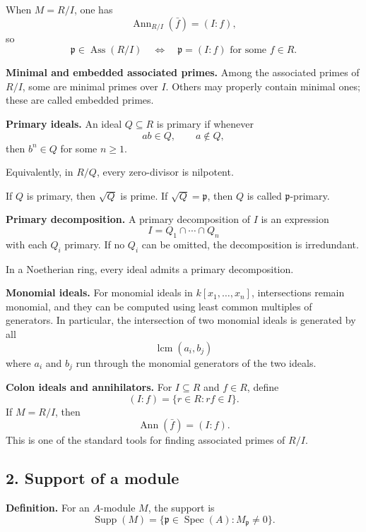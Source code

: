 \documentclass[12pt,a4paper]{article}
\theoremstyle{plain}
\theoremstyle{definition}      %
\begin{document}
	When \(M=R/I\), one has
	\[
	\operatorname{Ann}_{R/I}(\bar f)=(I:f),
	\]
	so
	\[
	\mathfrak p\in \operatorname{Ass}(R/I)
	\quad\Longleftrightarrow\quad
	\mathfrak p=(I:f)\text{ for some }f\in R.
	\]
	
	\medskip
	
	\textbf{Minimal and embedded associated primes.}
	Among the associated primes of \(R/I\), some are minimal primes over \(I\). Others may properly contain minimal ones; these are called embedded primes.
	
	\medskip
	
	\textbf{Primary ideals.}
	An ideal \(Q\subseteq R\) is primary if whenever
	\[
	ab\in Q,\qquad a\notin Q,
	\]
	then \(b^n\in Q\) for some \(n\ge 1\).
	
	Equivalently, in \(R/Q\), every zero-divisor is nilpotent.
	
	If \(Q\) is primary, then \(\sqrt Q\) is prime. If \(\sqrt Q=\mathfrak p\), then \(Q\) is called \(\mathfrak p\)-primary.
	
	\medskip
	
	\textbf{Primary decomposition.}
	A primary decomposition of \(I\) is an expression
	\[
	I=Q_1\cap\cdots\cap Q_n
	\]
	with each \(Q_i\) primary.
	If no \(Q_i\) can be omitted, the decomposition is irredundant.
	
	In a Noetherian ring, every ideal admits a primary decomposition.
	
	\medskip
	
	\textbf{Monomial ideals.}
	For monomial ideals in \(k[x_1,\dots,x_n]\), intersections remain monomial, and they can be computed using least common multiples of generators.
	In particular, the intersection of two monomial ideals is generated by all
	\[
	\operatorname{lcm}(a_i,b_j)
	\]
	where \(a_i\) and \(b_j\) run through the monomial generators of the two ideals.
	
	\medskip
	
	\textbf{Colon ideals and annihilators.}
	For \(I\subseteq R\) and \(f\in R\), define
	\[
	(I:f)=\{r\in R:rf\in I\}.
	\]
	If \(M=R/I\), then
	\[
	\operatorname{Ann}(\bar f)=(I:f).
	\]
	This is one of the standard tools for finding associated primes of \(R/I\).
	
	\subsection*{2. Support of a module}
	
	\textbf{Definition.}
	For an \(A\)-module \(M\), the support is
	\[
	\operatorname{Supp}(M)=\{\mathfrak p\in \operatorname{Spec}(A): M_{\mathfrak p}\neq 0\}.
	\]
	
\end{document}
